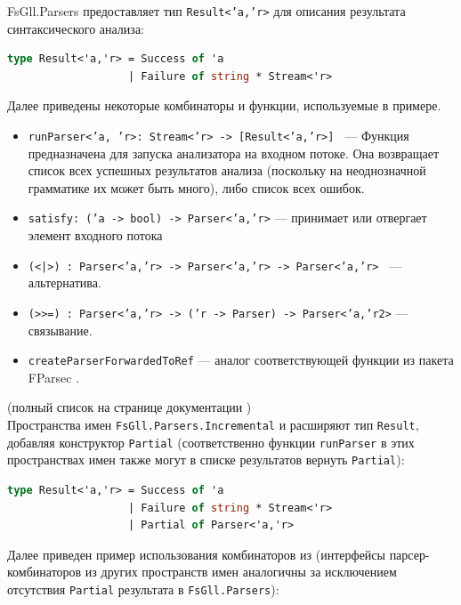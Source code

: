 \documentclass[14pt]{matmex-diploma}
\begin{document}
FsGll.Parsers предоставляет тип {\tt Result<'a,'r>} для описания результата синтаксического анализа:
\begin{lstlisting}[language=FSharp]
type Result<'a,'r> = Success of 'a
    	           | Failure of string * Stream<'r>
\end{lstlisting}

Далее приведены некоторые комбинаторы и функции, используемые в примере.
\begin{itemize}
    \item {\tt runParser<'a, 'r>: Stream<'r> -> [Result<'a,'r>] } --- Функция  предназначена для запуска анализатора на входном потоке. Она возвращает список всех успешных результатов анализа (поскольку на неоднозначной грамматике их может быть много), либо список всех ошибок.
    \item {\tt satisfy: ('a -> bool) -> Parser<'a,'r>} --- принимает или отвергает элемент входного потока 
    \item {\tt (<|>) : Parser<'a,'r> -> Parser<'a,'r> -> Parser<'a,'r> } --- альтернатива.
    \item {\tt (>}{\tt >=) : Parser<'a,'r> -> ('r -> Parser) -> Parser<'a,'r2>} --- связывание.
    \item {\tt createParserForwardedToRef} --- аналог соответствующей функции из пакета FParsec
        \cite{fparsec:createpforwtoref}.
\end{itemize}
(полный список на странице документации \cite{fsglldoc})\\

Пространства имен {\tt FsGll.Parsers.Incremental} и  
расширяют тип {\tt Result}, добавляя конструктор {\tt Partial} 
(соответственно функции {\tt runParser} в этих пространствах имен также могут 
в списке результатов вернуть {\tt Partial}):

\begin{lstlisting}[language=FSharp]
type Result<'a,'r> = Success of 'a
    	           | Failure of string * Stream<'r>
                   | Partial of Parser<'a,'r>
\end{lstlisting}

Далее приведен пример использования комбинаторов из  
(интерфейсы парсер-комбинаторов из других пространств имен аналогичны за исключением
отсутствия {\tt Partial} результата в {\tt FsGll.Parsers}):
\end{document}
